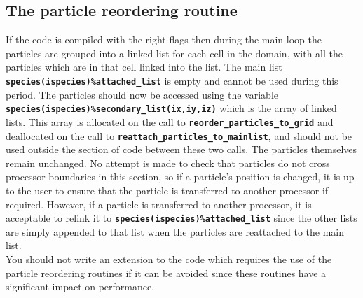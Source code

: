 \documentclass[12pt,a4paper]{article}
\newcommand{\inlinecode}[1]{{\color{warwickred} \bf\texttt{#1}}}
\begin{document}
\subsection{The particle reordering routine}
If the code is compiled with the right flags then during the main loop the
particles are grouped into a linked list for each cell in the domain, with all
the particles which are in that cell linked into the list. The main list
\inlinecode{species(ispecies)\%attached\_list} is empty and cannot be used
during this period. The particles should now be accessed using the variable
\inlinecode{species(ispecies)\%secondary\_list(ix,iy,iz)} which is the array of
linked lists. This array is allocated on the call to
\inlinecode{reorder\_particles\_to\_grid} and deallocated on the call to
\inlinecode{reattach\_particles\_to\_mainlist}, and should not be used outside
the section of code between these two calls. The particles themselves remain
unchanged. No attempt is made to check that particles do not cross processor
boundaries in this section, so if a particle's position is changed, it is up to
the user to ensure that the particle is transferred to another processor if
required. However, if a particle is transferred to another processor, it is
acceptable to relink it to \inlinecode{species(ispecies)\%attached\_list} since
the other lists are simply appended to that list when the particles are
reattached to the main list.\\

You should not write an extension to the code which requires the use of the
particle reordering routines if it can be avoided since these routines
have a significant impact on performance.

\pagebreak

\appendix
  \appendixpage
  \addappheadtotoc
\end{document}
